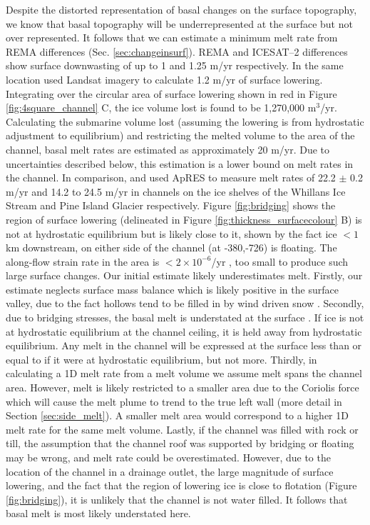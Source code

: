 Despite the distorted representation of basal changes on the surface topography, we know that basal topography will be underrepresented at the surface but not over represented. It follows that we can estimate a minimum melt rate from REMA differences (Sec. \ref{sec:changeinsurf}). REMA and ICESAT--2 differences show surface downwasting of up to 1 and 1.25 m/yr respectively. In the same location \cite{kim2016active} used Landsat imagery to calculate 1.2 m/yr of surface lowering.
Integrating over the circular area of surface lowering shown in red in Figure \ref{fig:4square_channel} C, the ice volume lost is found to be 1,270,000 $\mathrm{m}^3$/yr. Calculating the submarine volume lost (assuming the lowering is from hydrostatic adjustment to equilibrium) and restricting the melted volume to the area of the channel, basal melt rates are estimated as approximately 20 m/yr. Due to uncertainties described below, this estimation is a lower bound on melt rates in the channel. In comparison, \cite{marsh2016high} and \cite{stanton2013channelized} used ApRES to measure melt rates of 22.2 $\pm$ 0.2 m/yr and 14.2 to 24.5 m/yr in channels on the ice shelves of the Whillans Ice Stream and Pine Island Glacier respectively. 
Figure \ref{fig:bridging} shows the region of surface lowering (delineated in Figure \ref{fig:thickness_surfacecolour} B) is not at hydrostatic equilibrium but is likely close to it, shown by the fact ice $<1$ km downstream, on either side of the channel (at -380,-726) is floating. 
The along-flow strain rate in the area is $< 2 \times 10 ^{-6}$/yr \citep{alley2018continent}, too small to produce such large surface changes. 
Our initial estimate likely underestimates melt. Firstly, our estimate neglects surface mass balance which is likely positive in the surface valley, due to the fact hollows tend to be filled in by wind driven snow \citep[e.g.][]{gow1965relationship}. Secondly, due to bridging stresses, the basal melt is understated at the surface \citep{drews2015evolution}. If ice is not at hydrostatic equilibrium at the channel ceiling, it is held away from hydrostatic equilibrium. Any melt in the channel will be expressed at the surface less than or equal to if it were at hydrostatic equilibrium, but not more. Thirdly, in calculating a 1D melt rate from a melt volume we assume melt spans the channel area. However, melt is likely restricted to a smaller area due to the Coriolis force which will cause the melt plume to trend to the true left wall (more detail in Section \ref{sec:side_melt}). A smaller melt area would correspond to a higher 1D melt rate for the same melt volume.  
Lastly, if the channel was filled with rock or till, the assumption that the channel roof was supported by bridging or floating may be wrong, and melt rate could be overestimated. However, due to the location of the channel in a drainage outlet, the large magnitude of surface lowering, and the fact that the region of lowering ice is close to flotation (Figure \ref{fig:bridging}), it is unlikely that the channel is not water filled. It follows that basal melt is most likely understated here.

